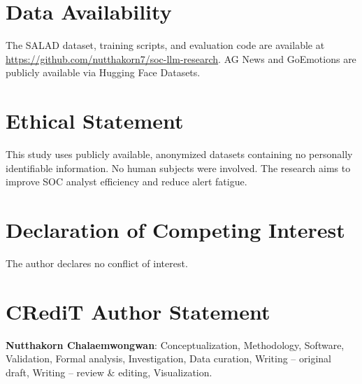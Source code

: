 \documentclass[review,3p]{elsarticle}
\begin{document}
\section*{Data Availability}
The SALAD dataset, training scripts, and evaluation code are available at \url{https://github.com/nutthakorn7/soc-llm-research}. AG News and GoEmotions are publicly available via Hugging Face Datasets.

\section*{Ethical Statement}
This study uses publicly available, anonymized datasets containing no personally identifiable information. No human subjects were involved. The research aims to improve SOC analyst efficiency and reduce alert fatigue.

\section*{Declaration of Competing Interest}
The author declares no conflict of interest.

\section*{CRediT Author Statement}
\textbf{Nutthakorn Chalaemwongwan}: Conceptualization, Methodology, Software, Validation, Formal analysis, Investigation, Data curation, Writing -- original draft, Writing -- review \& editing, Visualization.
\end{document}
